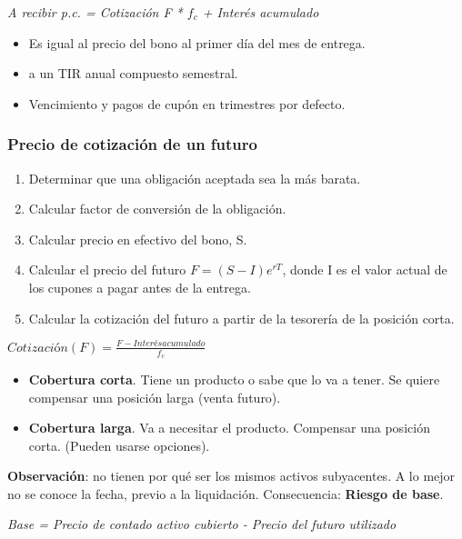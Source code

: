 \documentclass[
10pt, %
a4paper, %
oneside, %
headinclude,footinclude, %
BCOR5mm, %
]{scrartcl}
\newcommand{\n}[1]{\textbf{#1}}
\newcommand{\cur}[1]{\textit{#1}}
\newcommand{\sub}[1]{_{#1}}
\newcommand{\pot}[1]{^{#1}}
\newcommand{\f}[1]{{\large{${#1}$}}}
\newcounter{ex}
\begin{document}
			\cur{A recibir p.c. = Cotización F * \f{f\sub{c}} + Interés acumulado}


				\begin{itemize}
					\item Es igual al precio del bono al primer día del mes de entrega.
					\item a un TIR anual compuesto semestral.
					\item Vencimiento y pagos de cupón en trimestres por defecto.
				\end{itemize}

		\subsubsection{Precio de cotización de un futuro}
			\begin{enumerate}
				\item Determinar que una obligación aceptada sea la más barata.
				\item Calcular factor de conversión de la obligación.
				\item Calcular precio en efectivo del bono, S.
				\item Calcular el precio del futuro \f{F = (S-I)e\pot{rT}}, donde I es el valor actual de los cupones a pagar antes de la entrega.
				\item Calcular la cotización del futuro a partir de la tesorería de la posición corta.
			\end{enumerate}

			\begin{center} \f{Cotización(F) = \frac{F - Interés acumulado}{f\sub{c}}} \end{center}


			\begin{itemize}
				\item \n{Cobertura corta}. Tiene un producto o sabe que lo va a tener. Se quiere compensar una posición larga (venta futuro).
				\item \n{Cobertura larga}. Va a necesitar el producto. Compensar una posición corta. (Pueden usarse opciones).
			\end{itemize}

			\n{Observación}: no tienen por qué ser los mismos activos subyacentes. A lo mejor no se conoce la fecha, previo a la liquidación. Consecuencia: \n{Riesgo de base}.
			\begin{center} \cur{Base = Precio de contado activo cubierto - Precio del futuro utilizado} \end{center}
\end{document}
